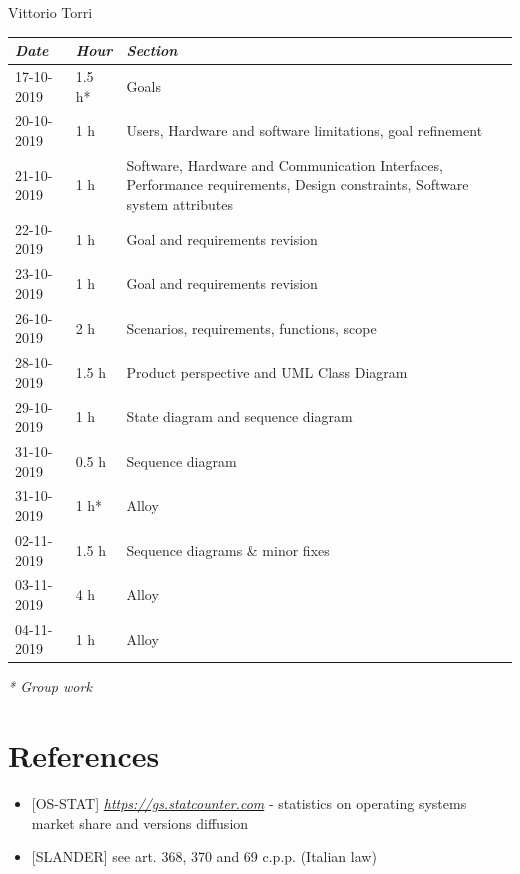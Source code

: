 \documentclass[a4paper]{report}
\begin{document}
\begin{center}
Vittorio Torri \\
\begin{tabular}{p{2cm}p{1.5cm}p{7cm}}
\toprule
\textit{Date} & \textit{Hour} & \textit{Section} \\ \midrule
17-10-2019 & 1.5 h* & Goals \\ \midrule
20-10-2019 & 1 h & Users, Hardware and software limitations, goal refinement \\ \midrule
21-10-2019 & 1 h & Software, Hardware and Communication Interfaces, Performance requirements, Design constraints, Software system attributes \\ \midrule
22-10-2019 & 1 h & Goal and requirements revision \\ \midrule
23-10-2019 & 1 h & Goal and requirements revision \\ \midrule
26-10-2019 & 2 h & Scenarios, requirements, functions, scope \\  \midrule
28-10-2019 & 1.5 h & Product perspective and UML Class Diagram \\ \midrule
29-10-2019 & 1 h & State diagram and sequence diagram \\ \midrule
31-10-2019 & 0.5 h & Sequence diagram \\ \midrule
31-10-2019 & 1 h* & Alloy \\ \midrule
02-11-2019 & 1.5 h & Sequence diagrams \& minor fixes \\ \midrule
03-11-2019 & 4 h & Alloy \\ \midrule
04-11-2019 & 1 h & Alloy \\ 
\bottomrule
\end{tabular}
\end{center}
\textit{* Group work}

\chapter{References}
\begin{itemize}

\item \label{ref:os-stats} [OS-STAT] \href{https://gs.statcounter.com}{\textit{https://gs.statcounter.com}} - statistics on operating systems market share and versions diffusion

\item \label{ref:slander} [SLANDER] see art. 368, 370 and 69 c.p.p. (Italian law)

\end{itemize}
\end{document}
